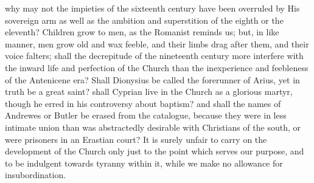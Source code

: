 why may not the impieties of the sixteenth century have been overruled
by His sovereign arm as well as the ambition and superstition of the
eighth or the eleventh? Children grow to men, as the Romanist reminds
us; but, in like manner, men grow old and wax feeble, and their limbs
drag after them, and their voice falters; shall the decrepitude
of the nineteenth century more interfere with the inward life and
perfection of the Church than the inexperience and feebleness of the
Antenicene era? Shall Dionysius be called the forerunner of Arius, yet
in truth be a great saint? shall Cyprian live in the Church as a
glorious martyr, though he erred in his controversy about baptism? and
shall the names of Andrewes or Butler be erased from the catalogue,
because they were in less intimate union than was abstractedly
desirable with Christians of the south, or were prisoners in an
Erastian court? It is surely unfair to carry on the development of the
Church only just to the point which serves our purpose, and to be
indulgent towards tyranny within it, while we make no allowance for
insubordination.


